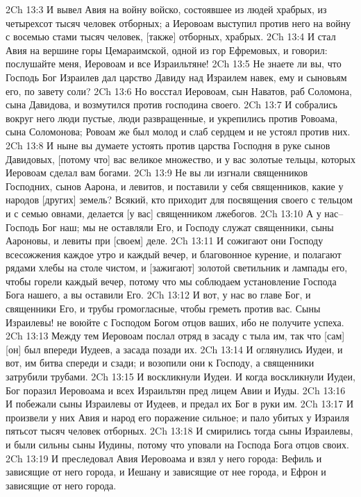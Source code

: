 2Ch 13:3  И вывел Авия на войну войско, состоявшее из людей храбрых, из четырехсот тысяч человек отборных; а Иеровоам выступил против него на войну с восемью стами тысяч человек, [также] отборных, храбрых.
2Ch 13:4  И стал Авия на вершине горы Цемараимской, одной из гор Ефремовых, и говорил: послушайте меня, Иеровоам и все Израильтяне!
2Ch 13:5  Не знаете ли вы, что Господь Бог Израилев дал царство Давиду над Израилем навек, ему и сыновьям его, по завету соли?
2Ch 13:6  Но восстал Иеровоам, сын Наватов, раб Соломона, сына Давидова, и возмутился против господина своего.
2Ch 13:7  И собрались вокруг него люди пустые, люди развращенные, и укрепились против Ровоама, сына Соломонова; Ровоам же был молод и слаб сердцем и не устоял против них.
2Ch 13:8  И ныне вы думаете устоять против царства Господня в руке сынов Давидовых, [потому что] вас великое множество, и у вас золотые тельцы, которых Иеровоам сделал вам богами.
2Ch 13:9  Не вы ли изгнали священников Господних, сынов Аарона, и левитов, и поставили у себя священников, какие у народов [других] земель? Всякий, кто приходит для посвящения своего с тельцом и с семью овнами, делается [у вас] священником лжебогов.
2Ch 13:10  А у нас--Господь Бог наш; мы не оставляли Его, и Господу служат священники, сыны Аароновы, и левиты при [своем] деле.
2Ch 13:11  И сожигают они Господу всесожжения каждое утро и каждый вечер, и благовонное курение, и полагают рядами хлебы на столе чистом, и [зажигают] золотой светильник и лампады его, чтобы горели каждый вечер, потому что мы соблюдаем установление Господа Бога нашего, а вы оставили Его.
2Ch 13:12  И вот, у нас во главе Бог, и священники Его, и трубы громогласные, чтобы греметь против вас. Сыны Израилевы! не воюйте с Господом Богом отцов ваших, ибо не получите успеха.
2Ch 13:13  Между тем Иеровоам послал отряд в засаду с тыла им, так что [сам] [он] был впереди Иудеев, а засада позади их.
2Ch 13:14  И оглянулись Иудеи, и вот, им битва спереди и сзади; и возопили они к Господу, а священники затрубили трубами.
2Ch 13:15  И воскликнули Иудеи. И когда воскликнули Иудеи, Бог поразил Иеровоама и всех Израильтян пред лицем Авии и Иуды.
2Ch 13:16  И побежали сыны Израилевы от Иудеев, и предал их Бог в руки им.
2Ch 13:17  И произвели у них Авия и народ его поражение сильное; и пало убитых у Израиля пятьсот тысяч человек отборных.
2Ch 13:18  И смирились тогда сыны Израилевы, и были сильны сыны Иудины, потому что уповали на Господа Бога отцов своих.
2Ch 13:19  И преследовал Авия Иеровоама и взял у него города: Вефиль и зависящие от него города, и Иешану и зависящие от нее города, и Ефрон и зависящие от него города.
